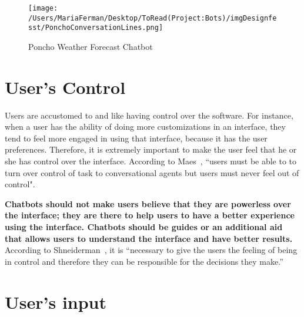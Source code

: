 \documentclass[a4paper,10pt]{article}
\begin{document}

\begin{figure}
\centering
\texttt{[image: /Users/MariaFerman/Desktop/ToRead(Project:Bots)/imgDesignfesst/PonchoConversationLines.png]}
\caption{Poncho Weather Forecast Chatbot}
\label{FigurePoncho}
\end{figure}
\section{User's Control}

Users are accustomed to and like having control over the software. For instance, when a user has the ability of doing more customizations in an interface, they tend to feel more engaged in using that interface, because it has the user preferences. Therefore, it is extremely important to make the user feel that he or she has control over the interface. According to Maes~\cite{shneiderman1997direct}, ``users must be able to to turn over control of task to conversational agents but users must never feel out of control".

\textbf{Chatbots should not make users believe that they are powerless over the interface; they are there to help users to have a better experience using the interface. Chatbots should be guides or an additional aid that allows users to understand the interface and have better results.} According to Shneiderman~\cite{shneiderman1997direct}, it is ``necessary to give the users the feeling of being in control and therefore they can be responsible for the decisions they make.” 
\section{User's input}
\end{document}
